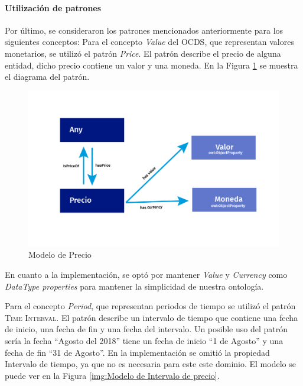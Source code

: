 \paragraph{Utilización de patrones}\hfill \break
Por último, se consideraron los patrones mencionados anteriormente para los siguientes conceptos:
Para el concepto \textit{Value} del OCDS, que representan valores monetarios, se utilizó el patrón \textit{Price}. El patrón describe el precio de alguna entidad, dicho precio contiene un valor y una moneda. En la Figura \ref{img:Modelo de Precio} se muestra el diagrama del patrón.

\begin{figure}[ht!]
    \centering
    \includegraphics[width=150mm]{figuras/Diagramas_Precio.png}
    \caption{Modelo de Precio}
    \label{img:Modelo de Precio}
    
\end{figure}

En cuanto a la implementación, se optó por mantener \textit{Value} y \textit{Currency} como \textit{DataType properties} para mantener la simplicidad de nuestra ontología.

Para el concepto \textit{Period}, que representan periodos de tiempo se utilizó el patrón \textsc{Time Interval}. El patrón describe un intervalo de tiempo que contiene una fecha de inicio, una fecha de fin y una fecha del intervalo. Un posible uso del patrón sería la fecha “Agosto del 2018” tiene un fecha de inicio “1 de Agosto” y una fecha de fin “31 de Agosto”. En la implementación se omitió la propiedad Intervalo de tiempo, ya que no es necesaria para este este dominio. El modelo se puede ver en la Figura \ref{img:Modelo de Intervalo de precio}.

